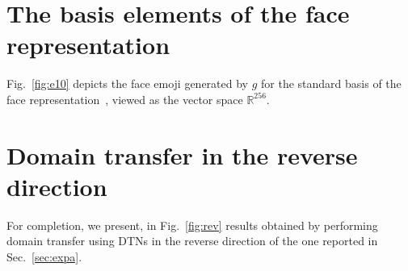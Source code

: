 \documentclass{article} %
\begin{document}
\section{The basis elements of the face representation}
\label{sec:e10}
Fig.~\ref{fig:e10} depicts the face emoji generated by $g$ for the standard basis of the face representation~\citep{deepface}, viewed as the vector space $\mathbb{R}^{256}$. 
\section{Domain transfer in the reverse direction}
\label{sec:humanizer}

For completion, we present, in Fig.~\ref{fig:rev} results obtained by performing domain transfer using DTNs in the reverse direction of the one reported in Sec.~\ref{sec:expa}.
\end{document}
